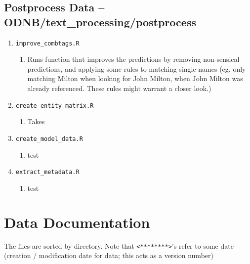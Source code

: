 \documentclass[11pt]{article}
\newcommand{\filename}[1]{\texttt{#1}}
\begin{document}
\subsection{Postprocess Data -- ODNB/text\_processing/postprocess}
\begin{enumerate}

\item \filename{improve\_combtags.R}
\begin{enumerate}
\item Runs function that improves the predictions by removing non-sensical predictions, and applying some rules to matching single-names (eg. only matching Milton when looking for John Milton, when John Milton was already referenced. These rules might warrant a closer look.)

\end{enumerate}

\item \filename{create\_entity\_matrix.R}
\begin{enumerate}
\item Takes 
\end{enumerate}

\item \filename{create\_model\_data.R}
\begin{enumerate}
\item test
\end{enumerate}


\item \filename{extract\_metadata.R}
\begin{enumerate}
\item test
\end{enumerate}


\end{enumerate}




\section{Data Documentation}
The files are sorted by directory. Note that \texttt{<********>}'s refer to some date (creation / modification date for data; this acts as a version number)
\end{document}
